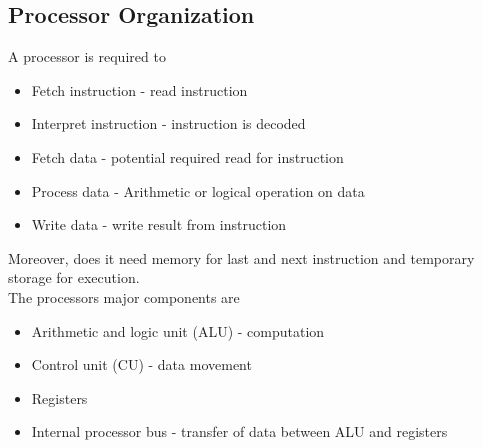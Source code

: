 \documentclass[12pt, a4paper]{article}
\begin{document}
		\subsection{Processor Organization}
			A processor is required to
			\begin{itemize}
				\item Fetch instruction - read instruction
				\item Interpret instruction - instruction is decoded
				\item Fetch data - potential required read for instruction
				\item Process data - Arithmetic or logical operation on data
				\item Write data - write result from instruction
			\end{itemize}
			Moreover, does it need memory for last and next instruction and temporary storage for execution.\\
			The processors major components are
			\begin{itemize}
				\item Arithmetic and logic unit (ALU) - computation
				\item Control unit (CU) - data movement
				\item Registers
				\item Internal processor bus - transfer of data between ALU and registers
			\end{itemize}
\end{document}
